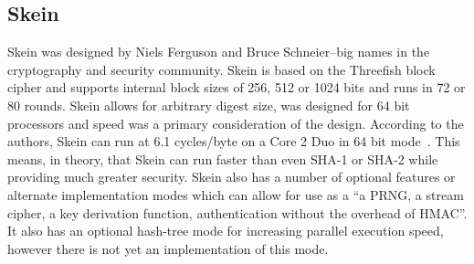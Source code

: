 \subsection*{Skein}

Skein was designed by Niels Ferguson and Bruce Schneier--big names in the cryptography and security community.
Skein is based on the Threefish block cipher and supports internal block sizes of 256, 512 or 1024 bits and runs in 72 or 80 rounds.
Skein allows for arbitrary digest size, was designed for 64 bit processors and speed was a primary consideration of the design.
According to the authors, Skein can run at 6.1 cycles/byte on a Core 2 Duo in 64 bit mode~\cite{SkeinSpeed}.
This means, in theory, that Skein can run faster than even SHA-1 or SHA-2 while providing much greater security.
Skein also has a number of optional features or alternate implementation modes which can allow for use as a ``a PRNG, a stream cipher, a key derivation function, authentication without the overhead of HMAC''\cite{SkeinSpeed}.
It also has an optional hash-tree mode for increasing parallel execution speed, however there is not yet an implementation of this mode. 

